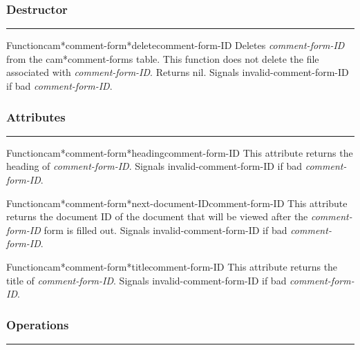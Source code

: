 \subsubsection*{Destructor}
\par\vspace*{0.00in}\par\hrule\par\medskip\par


\begin{functiondoc}{Function}{cam*comment-form*delete}{comment-form-ID}
Deletes {\em comment-form-ID} from the cam*comment-forms table.
This function does not delete the file associated with {\em comment-form-ID}.
Returns nil.
Signals invalid-comment-form-ID if bad {\em comment-form-ID}.
\end{functiondoc}


\subsubsection*{Attributes}
\par\vspace*{0.00in}\par\hrule\par\medskip\par


\begin{functiondoc}{Function}{cam*comment-form*heading}{comment-form-ID}
This attribute returns the heading of {\em comment-form-ID}.
Signals invalid-comment-form-ID if bad {\em comment-form-ID}.
\end{functiondoc}

\begin{functiondoc}{Function}{cam*comment-form*next-document-ID}{comment-form-ID}
This attribute returns the document ID of the document that will
be viewed after the {\em comment-form-ID} form is filled out.
Signals invalid-comment-form-ID if bad {\em comment-form-ID}.
\end{functiondoc}

\begin{functiondoc}{Function}{cam*comment-form*title}{comment-form-ID}
This attribute returns the title of {\em comment-form-ID}.
Signals invalid-comment-form-ID if bad {\em comment-form-ID}.
\end{functiondoc}


\subsubsection*{Operations}
\par\vspace*{0.00in}\par\hrule\par\medskip\par


